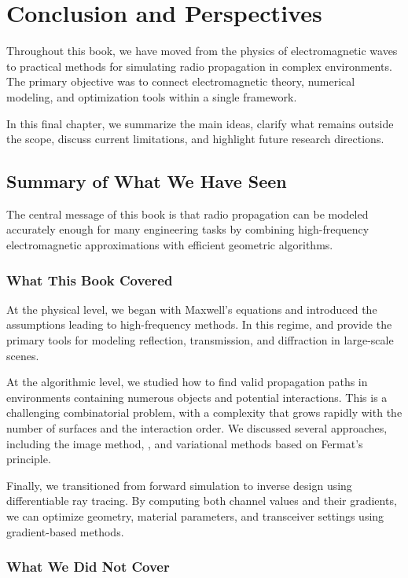 \chapter{Conclusion and Perspectives}

Throughout this book, we have moved from the physics of electromagnetic waves to practical methods for simulating radio propagation in complex environments. The primary objective was to connect electromagnetic theory, numerical modeling, and optimization tools within a single framework.

In this final chapter, we summarize the main ideas, clarify what remains outside the scope, discuss current limitations, and highlight future research directions.

\section{Summary of What We Have Seen}

The central message of this book is that radio propagation can be modeled accurately enough for many engineering tasks by combining high-frequency electromagnetic approximations with efficient geometric algorithms.

\subsection{What This Book Covered}

At the physical level, we began with Maxwell's equations and introduced the assumptions leading to high-frequency methods. In this regime,  and  provide the primary tools for modeling reflection, transmission, and diffraction in large-scale scenes.

At the algorithmic level, we studied how to find valid propagation paths in environments containing numerous objects and potential interactions. This is a challenging combinatorial problem, with a complexity that grows rapidly with the number of surfaces and the interaction order. We discussed several approaches, including the image method, , and variational methods based on Fermat's principle.

Finally, we transitioned from forward simulation to inverse design using differentiable ray tracing. By computing both channel values and their gradients, we can optimize geometry, material parameters, and transceiver settings using gradient-based methods.

\subsection{What We Did Not Cover}

